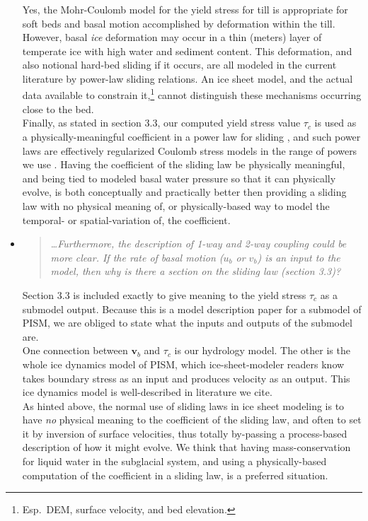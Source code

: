 \documentclass[11pt,reqno]{amsart}
\newcommand{\reply}[2]{
\medskip\medskip
\item  \begin{quote}
\emph{#1}
\end{quote}

\medskip
\noindent #2}
\begin{document}
\begin{itemize}
{\indent Yes, the Mohr-Coulomb model for the yield stress for till is appropriate for soft beds and basal motion accomplished by deformation within the till.  However, basal \emph{ice} deformation may occur in a thin (meters) layer of temperate ice with high water and sediment content. This deformation, and also notional hard-bed sliding if it occurs, are all modeled in the current literature by power-law sliding relations.  An ice sheet model, and the actual data available to constrain it,\footnote{Esp.~DEM, surface velocity, and bed elevation.} cannot distinguish these mechanisms occurring close to the bed. \\
\indent Finally, as stated in section 3.3, our computed yield stress value $\tau_c$ is used as a physically-meaningful coefficient in a power law for sliding \cite{AschwandenAdalgeirsdottirKhroulev}, and such power laws are effectively regularized Coulomb stress models in the range of powers we use \cite{SchoofCoulombBlatter}.  Having the coefficient of the sliding law be physically meaningful, and being tied to modeled basal water pressure so that it can physically evolve, is both conceptually and practically better then providing a sliding law with no physical meaning of, or physically-based way to model the temporal- or spatial-variation of, the coefficient.}

\reply{\dots  Furthermore, the description of 1-way and 2-way coupling could be more clear. If the rate of basal motion ($u_b$ or $v_b$) is an input to the model, then why is there a section on the sliding law (section 3.3)?}
{Section 3.3 is included exactly to give meaning to the yield stress $\tau_c$ as a submodel output.  Because this is a model description paper for a submodel of PISM, we are obliged to state what the inputs and outputs of the submodel are.\\
\indent One connection between $\mathbf{v}_b$ and $\tau_c$ is our hydrology model.  The other is the whole ice dynamics model of PISM, which ice-sheet-modeler readers know takes boundary stress as an input and produces velocity as an output.  This ice dynamics model is well-described in literature we cite. \\
\indent As hinted above, the normal use of sliding laws in ice sheet modeling is to have \emph{no} physical meaning to the coefficient of the sliding law, and often to set it by inversion of surface velocities, thus totally by-passing a process-based description of how it might evolve.  We think that having mass-conservation for liquid water in the subglacial system, and using a physically-based computation of the coefficient in a sliding law, is a preferred situation.}


\end{itemize}
\end{document}
